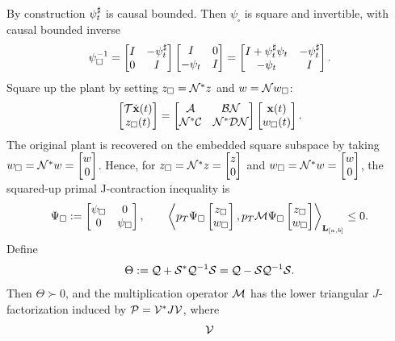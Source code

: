 \begin{example}
\begin{equation}
    \end{equation}
    By construction $\psi_t^\sharp$ is causal bounded.
    Then $\psi_\square$ is square and invertible, with causal bounded inverse
    \begin{equation}
        \psi_\square^{-1}
        =
        \begin{bmatrix}I & -\psi_t^\sharp \\ 0 & I\end{bmatrix}
        \begin{bmatrix}I & 0 \\ -\psi_t & I\end{bmatrix}
        =
        \begin{bmatrix}
            I+\psi_t^\sharp\psi_t & -\psi_t^\sharp\\
            -\psi_t & I
        \end{bmatrix}.
    \end{equation}
    Square up the plant by setting $z_\square=\mathcal{N}^*z$ and
    $w=\mathcal{N}w_\square$:
    \begin{equation}
        \begin{bmatrix}\mathcal{T}\dot{\mathbf{x}}(t)\\ z_\square(t)\end{bmatrix}
        =
        \begin{bmatrix}
        \mathcal{A} & \mathcal{B}\mathcal{N}\\
        \mathcal{N}^*\mathcal{C} & \mathcal{N}^*\mathcal{D}\mathcal{N}
        \end{bmatrix}
        \begin{bmatrix}\mathbf{x}(t)\\ w_\square(t)\end{bmatrix}.
    \end{equation}
    The original plant is recovered on the embedded square subspace by taking
    $w_\square=\mathcal{N}^*w=\begin{bmatrix}w\\0\end{bmatrix}$. Hence, for
    $z_\square=\mathcal{N}^*z=\begin{bmatrix}z\\0\end{bmatrix}$ and
    $w_\square=\mathcal{N}^*w=\begin{bmatrix}w\\0\end{bmatrix}$, the squared-up primal J-contraction
    inequality is
    \begin{equation}
        \Psi_\square
        :=
        \begin{bmatrix}\psi_\square&0\\0&\psi_\square\end{bmatrix},
        \qquad
        \left\langle 
            p_T\Psi_\square\begin{bmatrix}z_\square\\w_\square\end{bmatrix}
        , 
            p_T\mathcal{M}\Psi_\square\begin{bmatrix}z_\square\\w_\square\end{bmatrix}
         \right\rangle_{\mathbf{L}_{[a,b]}}
        \leq0.
    \end{equation}
    Define
    \begin{equation}
        \Theta
        :=
        \mathcal{Q}+\mathcal{S}^*\mathcal{Q}^{-1}\mathcal{S}
        =
        \mathcal{Q}-\mathcal{S}\mathcal{Q}^{-1}\mathcal{S}.
    \end{equation}
    Then $\Theta\succ0$, and the multiplication operator $\mathcal{M}$ has
    the lower triangular $J$-factorization induced by
    $\mathcal{P}=\mathcal{V}^*J\mathcal{V}$, where
    \begin{equation}
        \mcl{V}

\end{equation}
\end{example}

